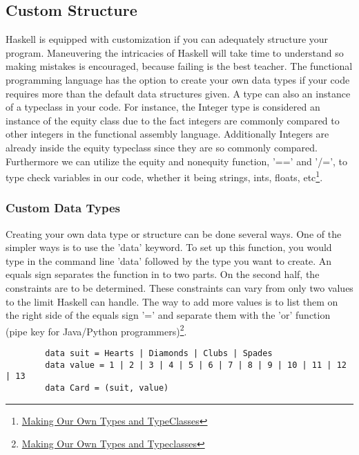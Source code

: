 \documentclass{article}
\begin{document}
\subsection{Custom Structure}
Haskell is equipped with customization if you can adequately structure your program. Maneuvering the intricacies of Haskell will take time to understand so making mistakes is encouraged, because failing is the best teacher. The functional programming language has the option to create your own data types if your code requires more than the default data structures given. A type can also an instance of a typeclass in your code. For instance, the Integer type is considered an instance of the equity class due to the fact integers are commonly compared to other integers in the functional assembly language. Additionally Integers are already inside the equity typeclass since they are so commonly compared. Furthermore we can utilize the equity and nonequity function, '==' and '/=', to type check variables in our code, whether it being strings, ints, floats, etc\footnote{\href{http://learnyouahaskell.com/making-our-own-types-and-typeclasses}{Making Our Own Types and TypeClasses}}.

    \subsubsection{Custom Data Types}
    Creating your own data type or structure can be done several ways. One of the simpler ways is to use the 'data' keyword. To set up this function, you would type in the command line 'data' followed by the type you want to create. An equals sign separates the function in to two parts. On the second half, the constraints are to be determined. These constraints can vary from only two values to the limit Haskell can handle. The way to add more values is to list them on the right side of the equals sign '=' and separate them with the 'or' function (pipe key for Java/Python programmers)\footnote{\href{http://learnyouahaskell.com/making-our-own-types-and-typeclasses}{Making Our Own Types and Typeclasses}}.
    
    \begin{lstlisting}
        data suit = Hearts | Diamonds | Clubs | Spades 
        data value = 1 | 2 | 3 | 4 | 5 | 6 | 7 | 8 | 9 | 10 | 11 | 12 | 13  
        data Card = (suit, value)
    \end{lstlisting}
    
\end{document}
